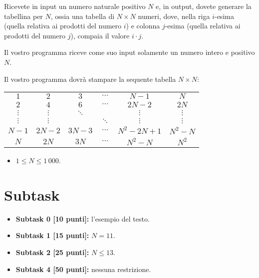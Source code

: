 \renewcommand{\nomebreve}{for2\_std}
\renewcommand{\titolo}{Esercizio sui for annidati - computo tabelline}

\introduzione{}

Ricevete in input un numero naturale positivo $N$ e,
in output, dovete generare la tabellina per $N$,
ossia una tabella di $N\times N$ numeri, dove,
nella riga $i$-esima (quella relativa ai prodotti del numero $i$)
e colonna $j$-esima  (quella relativa ai prodotti del numero $j$),
compaia il valore $i\cdot j$.

Il vostro programma riceve come suo input solamente un numero intero e positivo $N$.


Il vostro programma dovrà stampare la sequente tabella $N\times N$:\\

\begin{tabular}{cccccc}
    $1$   &   $2$    &  $3$     & $\cdots$ &  $N-1$     &  $N$ \\
    $2$   &   $4$    &  $6$     & $\cdots$ & $2N-2$     & $2N$ \\
 $\vdots$ & $\vdots$ & $\ddots$ &          &   $\vdots$ &  $\vdots$ \\
 $\vdots$ & $\vdots$ &          & $\ddots$ &   $\vdots$ &  $\vdots$ \\
  $N-1$   & $2N-2$   & $3N-3$   & $\cdots$ & $N^2-2N+1$ & $N^2-N$ \\
    $N$   &  $2N$    & $3N$     & $\cdots$ &    $N^2-N$ &  $N^2$
\end{tabular}


\begin{itemize}[nolistsep, noitemsep]
  \item $1 \le N \le 1\,000$.
\end{itemize}
  
  \section*{Subtask}
  \begin{itemize}
    \item \textbf{Subtask 0 [10 punti]:} l'esempio del testo.
    \item \textbf{Subtask 1 [15 punti]:} $N = 11$.
    \item \textbf{Subtask 2 [25 punti]:} $N \leq 13$.
    \item \textbf{Subtask 4 [50 punti]:} nessuna restrizione.
  \end{itemize}
  
